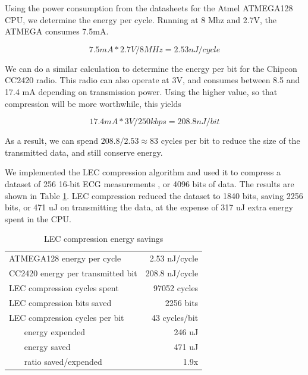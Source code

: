 Using the power consumption from the datasheets for the Atmel ATMEGA128 \cite{Atmel:ATMEGA128Datasheet} CPU, we determine the energy per cycle. Running at 8 Mhz and 2.7V, the ATMEGA consumes 7.5mA.

\begin{equation}
	7.5mA * 2.7V / 8MHz = 2.53nJ / cycle  
\end{equation}

We can do a similar calculation to determine the energy per bit for the Chipcon CC2420 radio.  This radio can also operate at 3V, and consumes between 8.5 and 17.4 mA depending on transmission power. Using the higher value, so that compression will be more worthwhile, this yields

\begin{equation}
  17.4mA * 3V / 250kbps = 208.8nJ / bit
\end{equation}

As a result, we can spend $208.8/2.53 \approx 83$ cycles per bit to reduce the size of the transmitted data, and still conserve energy.

We implemented the LEC compression algorithm and used it to compress a dataset of 256 16-bit ECG measurements \cite{physionet-ecg-data}, or 4096 bits of data. The results are shown in Table \ref{tbl-lec-energy}. LEC compression reduced the dataset to 1840 bits, saving 2256 bits, or 471 uJ on transmitting the data, at the expense of 317 uJ extra energy spent in the CPU.

\begin{table}[H]
\centering
\caption{LEC compression energy savings}
\label{tbl-lec-energy}
\begin{tabular}{lr}
\toprule
\midrule
ATMEGA128 energy per cycle            & 2.53 nJ/cycle  \\
CC2420 energy per transmitted bit     & 208.8 nJ/cycle  \\
\midrule
LEC compression cycles spent          & 97052 cycles\\
LEC compression bits saved            & 2256 bits \\
LEC compression cycles per bit        & 43 cycles/bit \\
~~~ energy expended                   & 246 uJ \\
~~~ energy saved                      & 471 uJ \\
~~~ ratio saved/expended              & 1.9x \\
\bottomrule
\end{tabular}
\end{table}

